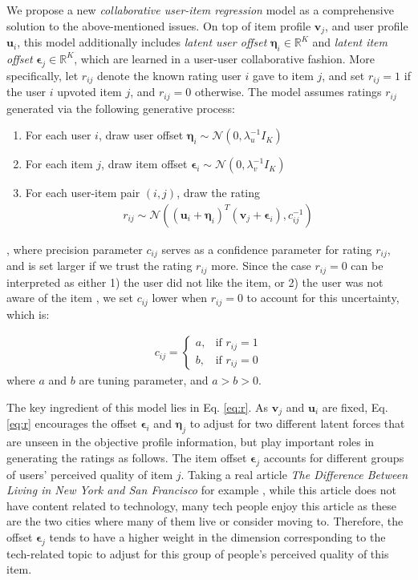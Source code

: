 \documentclass[conference]{IEEEtran}
\begin{document}
We propose a new \textit{collaborative user-item regression} model as a comprehensive solution to the above-mentioned issues. On top of item profile $\mathbf{v}_j$, and user profile $\mathbf{u}_i$, this model additionally includes \textit{latent user offset} $\mathbf{\eta}_i  \in \mathbb{R}^K$ and \textit{latent item offset} $\mathbf{\epsilon}_j  \in \mathbb{R}^K$, which are learned in a user-user collaborative fashion. More specifically, let $r_{ij}$ denote the known rating user $i$ gave to item $j$, and set $r_{ij}=1$ if the user $i$ upvoted item $j$, and $r_{ij}=0$ otherwise. The model assumes ratings $r_{ij}$ generated via the following generative process:

\begin{enumerate}
\item For each user $i$, draw user offset $\mathbf{\eta}_i \sim \mathcal{N}(0, \lambda_u^{-1}I_K)$
\item For each item $j$, draw item offset $\mathbf{\epsilon}_i \sim \mathcal{N}(0, \lambda_v^{-1}I_K)$
\item For each user-item pair $(i, j)$, draw the rating
\begin{eqnarray} \label{eq:r}
 r_{ij} \sim \mathcal{N}((\mathbf{u}_i+\mathbf{\eta}_i)^T(\mathbf{v}_j+\mathbf{\epsilon}_i), c_{ij}^{-1})
\end{eqnarray}
\end{enumerate}, where precision parameter $c_{ij}$ serves as a confidence parameter for rating $r_{ij}$, and is set larger if we trust the rating $r_{ij}$ more. Since the case $r_{ij}=0$ can be interpreted as either 1) the user did not like the item, or 2) the user was not aware of the item \cite{hu2008collaborative,wang2011collaborative}, we set $c_{ij}$ lower when $r_{ij}=0$ to account for this uncertainty, which is:

\begin{eqnarray}
c_{ij} = 
\begin{cases} 
a, & \mbox{if }  r_{ij} = 1 \\ 
b, & \mbox{if }  r_{ij} = 0 
\end{cases}
\end{eqnarray} where $a$ and $b$ are tuning parameter, and $a > b > 0$.

The key ingredient of this model lies in Eq. \ref{eq:r}. As $\mathbf{v}_j$ and $\mathbf{u}_i$ are fixed, Eq. \ref{eq:r} encourages the offset $\mathbf{\epsilon}_i$ and $\mathbf{\eta}_j$ to adjust for two different latent forces that are unseen in the objective profile information, but play important roles in generating the ratings as follows. The item offset $\mathbf{\epsilon}_j$ accounts for different groups of users' perceived quality of item $j$. Taking a real article \textit{The Difference Between Living in New York and San Francisco} for example \cite{articleSample}, while this article does not have content related to technology, many tech people enjoy this article as these are the two cities where many of them live or consider moving to. Therefore, the offset $\mathbf{\epsilon}_j$ tends to have a higher weight in the dimension corresponding to the tech-related topic to adjust for this group of people's perceived quality of this item. 
\end{document}
